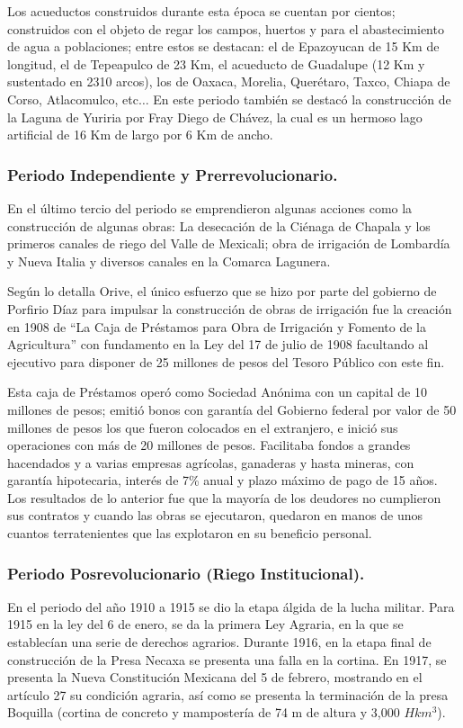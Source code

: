 Los acueductos construidos durante esta época se cuentan por cientos; construidos con el objeto de regar los campos, huertos y para el abastecimiento de agua a poblaciones; entre estos se destacan: el de Epazoyucan de 15 Km de longitud, el de Tepeapulco de 23 Km, el acueducto de Guadalupe (12 Km y sustentado en 2310 arcos), los de Oaxaca, Morelia, Querétaro, Taxco, Chiapa de Corso, Atlacomulco, etc$\ldots$ En este periodo también se destacó la construcción de la Laguna de Yuriria por Fray Diego de Chávez, la cual es un hermoso lago artificial de 16 Km de largo por 6 Km de ancho.
\subsubsection{Periodo Independiente y Prerrevolucionario.}
En el último tercio del periodo se emprendieron algunas acciones como la construcción de algunas obras: La desecación de la Ciénaga de Chapala y los primeros canales de riego del Valle de Mexicali; obra de irrigación de Lombardía y Nueva Italia y diversos canales en la Comarca Lagunera.

Según lo detalla Orive, el único esfuerzo que se hizo por parte del gobierno de Porfirio Díaz para impulsar la construcción de obras de irrigación fue la creación en 1908 de “La Caja de Préstamos para Obra de Irrigación y Fomento de la Agricultura” con fundamento en la Ley del 17 de julio de 1908 facultando al ejecutivo para disponer de 25 millones de pesos del Tesoro Público con este fin.

Esta caja de Préstamos operó como Sociedad Anónima con un capital de 10 millones de pesos; emitió bonos con garantía del Gobierno federal por valor de 50 millones de pesos los que fueron colocados en el extranjero, e inició sus operaciones con más de 20 millones de pesos. Facilitaba fondos a grandes hacendados y a varias empresas agrícolas, ganaderas y hasta mineras, con garantía hipotecaria, interés de 7\% anual y plazo máximo de pago de 15 años. Los resultados de lo anterior fue que la mayoría de los deudores no cumplieron sus contratos y cuando las obras se ejecutaron, quedaron en manos de unos cuantos terratenientes que las explotaron en su beneficio personal.

\subsubsection{Periodo Posrevolucionario (Riego Institucional).}
En el periodo del año 1910 a 1915 se dio la etapa álgida de la lucha militar. Para 1915 en la ley del 6 de enero, se da la primera Ley Agraria, en la que se establecían una serie de derechos agrarios. Durante 1916, en la etapa final de construcción de la Presa Necaxa se presenta una falla en la cortina. En 1917, se presenta la Nueva Constitución Mexicana del 5 de febrero, mostrando en el artículo 27 su condición agraria, así como se presenta la terminación de la presa Boquilla (cortina de concreto y mampostería de 74 m de altura y 3,000 $Hkm^3$).

